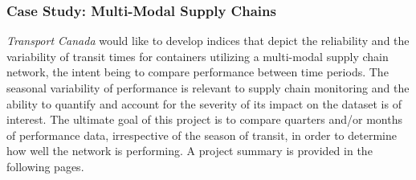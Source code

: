 \subsubsection{Case Study: Multi-Modal Supply Chains}
\textit{Transport Canada} would like to develop indices that depict the reliability and the variability of transit times for containers utilizing a multi-modal supply chain network, the intent being to compare performance between time periods. The seasonal variability of performance is relevant to supply chain monitoring and the ability to quantify and account for the severity of its impact on the dataset is of interest. The ultimate goal of this project is to compare quarters and/or months of performance data, irrespective of the season of transit, in order to determine how well the network is performing.
\newl A project summary is provided in the following pages. 
